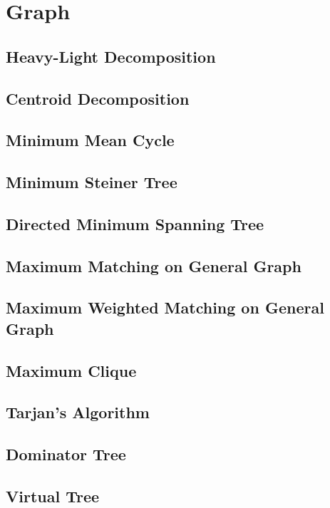 \documentclass[a4paper,10pt,twocolumn,oneside]{article}
\begin{document}
\section{Graph}
\subsection{Heavy-Light Decomposition}

\subsection{Centroid Decomposition}

\subsection{Minimum Mean Cycle}

\subsection{Minimum Steiner Tree}

\subsection{Directed Minimum Spanning Tree}

\subsection{Maximum Matching on General Graph}

\subsection{Maximum Weighted Matching on General Graph}

\subsection{Maximum Clique}

\subsection{Tarjan's Algorithm}

\subsection{Dominator Tree}

\subsection{Virtual Tree}

\end{document}
